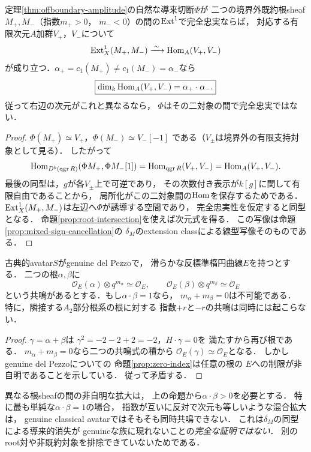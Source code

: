 \begin{corollary}[導来完全忠実性に対する有限次元表現テスト]
\label{cor:affine-ext-test}
定理\ref{thm:offboundary-amplitude}の自然な導来切断$\Phi$が
二つの境界外既約根sheaf$M_+,M_-$（指数$m_+>0$，
$m_-<0$）の間の$\operatorname{Ext}^1$で完全忠実ならば，
対応する有限次元$A$加群$V_+$，$V_-$について
\[
\operatorname{Ext}^1_X(M_+,M_-)
 \xrightarrow{\;\sim\;}\operatorname{Hom}_A(V_+,V_-)
\]
が成り立つ．$\alpha_+=c_1(M_+)\ne c_1(M_-)=\alpha_-$なら
\[
\boxed{\dim_k\operatorname{Hom}_A(V_+,V_-)=\alpha_+\cdot\alpha_- .}
\]
従って右辺の次元がこれと異なるなら，
$\Phi$はその二対象の間で完全忠実ではない．
\end{corollary}
\begin{proof}
$\Phi(M_+)\simeq V_+$，$\Phi(M_-)\simeq V_-[-1]$
である（$V_\pm$は境界外の有限支持対象として見る）．
したがって
\[
\operatorname{Hom}_{D^b(\operatorname{qgr} R)}(\Phi M_+,\Phi M_-[1])
 =\operatorname{Hom}_{\operatorname{qgr} R}(V_+,V_-)=\operatorname{Hom}_A(V_+,V_-).
\]
最後の同型は，$g$が各$V_\pm$上で可逆であり，
その次数付き表示が$k[g]$に関して有限自由であることから，
局所化がこの二対象間の$\operatorname{Hom}$を保存するためである．
$\operatorname{Ext}^1_X(M_+,M_-)$は左辺へ$\Phi$が誘導する空間であり，
完全忠実性を仮定すると同型となる．
命題\ref{prop:root-intersection}を使えば次元式を得る．
この写像は命題\ref{prop:mixed-sign-cancellation}の
$\delta_M$のextension classによる線型写像そのものである．
\end{proof}

\begin{proposition}[根の和による反対指数の同時共鳴排除]
\label{prop:root-sum-exclusion}
古典的avatar$S$がgenuine del Pezzoで，
滑らかな反標準楕円曲線$E$を持つとする．
二つの根$\alpha,\beta$に
\[
 \mathcal O_E(\alpha)\otimes q^{m_\alpha}\simeq\mathcal O_E,
 \qquad
 \mathcal O_E(\beta)\otimes q^{m_\beta}\simeq\mathcal O_E
\]
という共鳴があるとする．もし$\alpha\cdot\beta=1$なら，
$m_\alpha+m_\beta=0$は不可能である．
特に，隣接する$A_2$部分根系の根に対する
指数$+r$と$-r$の共鳴は同時には起こらない．
\end{proposition}
\begin{proof}
$\gamma=\alpha+\beta$は
$\gamma^2=-2-2+2=-2$，$H\cdot\gamma=0$を
満たすから再び根である．
$m_\alpha+m_\beta=0$なら二つの共鳴式の積から
$\mathcal O_E(\gamma)\simeq\mathcal O_E$となる．
しかしgenuine del Pezzoについての
命題\ref{prop:zero-index}は任意の根の
$E$への制限が非自明であることを示している．
従って矛盾する．
\end{proof}

\begin{remark}[完全な相殺を探すときの制限]
異なる根sheafの間の非自明な拡大は，
上の命題から$\alpha\cdot\beta>0$を必要とする．
特に最も単純な$\alpha\cdot\beta=1$の場合，
指数が互いに反対で次元も等しいような混合拡大は，
genuine classical avatarではそもそも同時共鳴できない．
これは$\delta_M$の同型による導来的消失が
genuineな族に現れないことの\emph{完全な証明ではない}．
別のroot対や非既約対象を排除できていないためである．
\end{remark}

